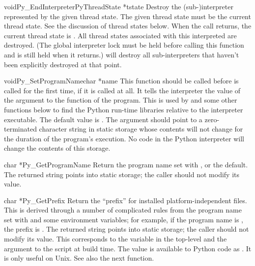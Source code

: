 \documentclass[twoside]{report}
\begin{document}
\begin{cfuncdesc}{void}{Py_EndInterpreter}{PyThreadState *tstate}
Destroy the (sub-)interpreter represented by the given thread state.  
The given thread state must be the current thread state.  See the 
discussion of thread states below.  When the call returns, the current 
thread state is \NULL{}.  All thread states associated with this 
interpreted are destroyed.  (The global interpreter lock must be held 
before calling this function and is still held when it returns.)  
 will destroy all sub-interpreters that haven't 
been explicitly destroyed at that point.
\end{cfuncdesc}

\begin{cfuncdesc}{void}{Py_SetProgramName}{char *name}
This function should be called before  is called 
for the first time, if it is called at all.  It tells the interpreter 
the value of the  argument to the  function 
of the program.  This is used by  and some other 
functions below to find the Python run-time libraries relative to the 
interpreter executable.  The default value is .  The 
argument should point to a zero-terminated character string in static 
storage whose contents will not change for the duration of the 
program's execution.  No code in the Python interpreter will change 
the contents of this storage.
\end{cfuncdesc}

\begin{cfuncdesc}{char *}{Py_GetProgramName}{}
Return the program name set with , or the 
default.  The returned string points into static storage; the caller 
should not modify its value.
\end{cfuncdesc}

\begin{cfuncdesc}{char *}{Py_GetPrefix}{}
Return the ``prefix'' for installed platform-independent files.  This 
is derived through a number of complicated rules from the program name 
set with  and some environment variables; 
for example, if the program name is , 
the prefix is .  The returned string points into 
static storage; the caller should not modify its value.  This 
corresponds to the  variable in the top-level 
 and the  argument to the 
 script at build time.  The value is available to 
Python code as .  It is only useful on Unix.  See 
also the next function.
\end{cfuncdesc}
\end{document}
